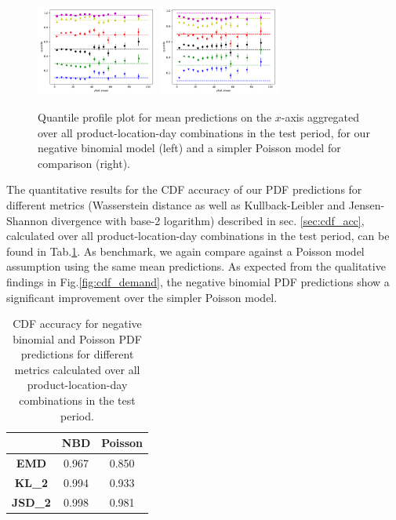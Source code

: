 \documentclass[BCOR=1mm, DIV=calc,10pt,
twoside=true,
twocolumn,
headings=normal]{scrartcl}
\newcommand{\fig}{Fig.}
\newcommand{\tab}{Tab.}
\begin{document}
\begin{figure}
\begin{center}
\includegraphics[width=4cm]{../figures/invquant_yhat_mean_nbinom}
\includegraphics[width=4cm]{../figures/invquant_yhat_mean_poisson}
\caption{\label{fig:invquant_mean} Quantile profile plot for mean predictions on the $x$-axis aggregated over all product-location-day combinations in the test period, for our negative binomial model (left) and a simpler Poisson model for comparison (right).}
\end{center}
\end{figure}

The quantitative results for the CDF accuracy of our PDF predictions for different metrics (Wasserstein distance as well as Kullback-Leibler and Jensen-Shannon divergence with base-2 logarithm) described in sec. \ref{sec:cdf_acc}, calculated over all product-location-day combinations in the test period, can be found in \tab \ref{tab:cdf_acc}. As benchmark, we again compare against a Poisson model assumption using the same mean predictions. As expected from the qualitative findings in \fig \ref{fig:cdf_demand}, the negative binomial PDF predictions show a significant improvement over the simpler Poisson model.

\begin{table}[h!]
\begin{center}
\caption{CDF accuracy for negative binomial and Poisson PDF predictions for different metrics calculated over all product-location-day combinations in the test period.}
\label{tab:cdf_acc}
\begin{tabular}{c|c|c}
 & \textbf{NBD} & \textbf{Poisson} \\
\hline
\textbf{EMD} & 0.967 & 0.850 \\
\textbf{KL\_2} & 0.994 & 0.933 \\
\textbf{JSD\_2} & 0.998 & 0.981
\end{tabular}
\end{center}
\end{table}
\end{document}
